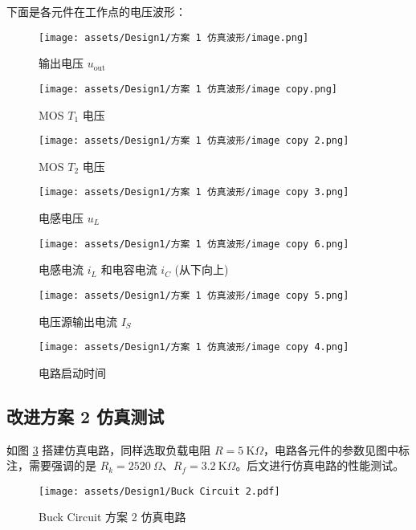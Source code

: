 \documentclass[UTF8]{article}
\def\kO{\ \mathrm{K}\Omega}
\def\KO{\ \mathrm{K}\Omega}
\def\kO{\ \mathrm{K}\Omega}
\def\KO{\ \mathrm{K}\Omega}
\theoremstyle{MyLineTheoremStyle} %
\theoremstyle{MyBlockTheoremStyle} %
\theoremstyle{MySubsubsectionStyle} %
\begin{document}
下面是各元件在工作点的电压波形：
\begin{figure}[H]\centering
    \texttt{[image: assets/Design1/方案 1 仿真波形/image.png]}
    \caption{输出电压 $u_{\text{out}}$}
    \label{输出电压 1}
\end{figure}
\begin{figure}[H]\centering
    \texttt{[image: assets/Design1/方案 1 仿真波形/image copy.png]}
    \caption{MOS $T_1$ 电压}
\end{figure}
\begin{figure}[H]\centering
    \texttt{[image: assets/Design1/方案 1 仿真波形/image copy 2.png]}
    \caption{MOS $T_2$ 电压}
\end{figure}
\begin{figure}[H]\centering
    \texttt{[image: assets/Design1/方案 1 仿真波形/image copy 3.png]}
    \caption{电感电压 $u_L$}
\end{figure}
\begin{figure}[H]\centering
    \texttt{[image: assets/Design1/方案 1 仿真波形/image copy 6.png]}
    \caption{电感电流 $i_L$ 和电容电流 $i_C$ (从下向上)}
\end{figure}
\begin{figure}[H]\centering
    \texttt{[image: assets/Design1/方案 1 仿真波形/image copy 5.png]}
    \caption{电压源输出电流 $I_S$}
\end{figure}
\begin{figure}[H]\centering
    \texttt{[image: assets/Design1/方案 1 仿真波形/image copy 4.png]}
    \caption{电路启动时间}
    \label{启动时间 1}
\end{figure}

\subsection{改进方案 2 仿真测试}

如图 \ref{Buck Circuit 方案 2} 搭建仿真电路，同样选取负载电阻 $R = 5 \kO$，电路各元件的参数见图中标注，需要强调的是 $R_k = 2520\ \Omega$、$R_f =  3.2 \KO$。后文进行仿真电路的性能测试。

\begin{figure}[H]\centering
    \texttt{[image: assets/Design1/Buck Circuit 2.pdf]}
    \caption{Buck Circuit 方案 2 仿真电路}
    \label{Buck Circuit 方案 2}
\end{figure}
\end{document}
